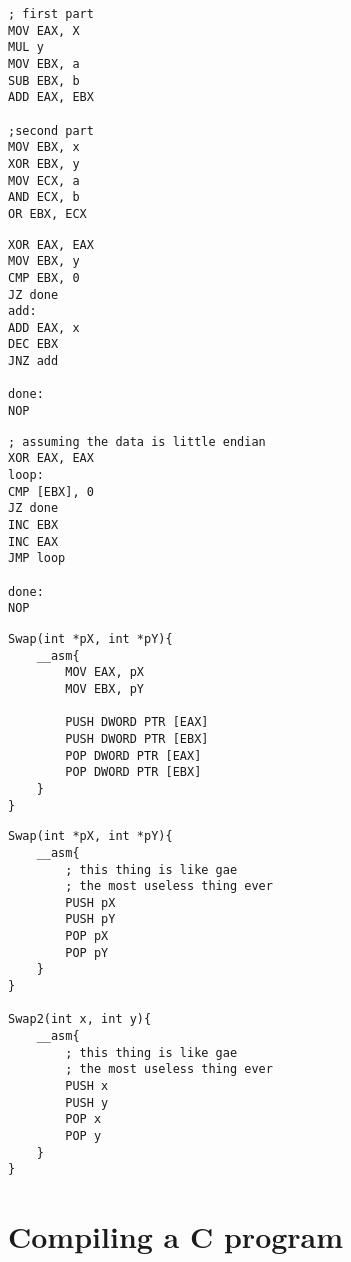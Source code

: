\documentclass[11pt,letterpaper]{article}
\begin{document}

\begin{verbatim}
; first part
MOV EAX, X
MUL y
MOV EBX, a
SUB EBX, b
ADD EAX, EBX

;second part
MOV EBX, x
XOR EBX, y
MOV ECX, a
AND ECX, b
OR EBX, ECX
\end{verbatim}

\pagebreak
{}
\begin{verbatim}
XOR EAX, EAX
MOV EBX, y
CMP EBX, 0
JZ done
add:	
ADD EAX, x
DEC EBX
JNZ add

done:
NOP
\end{verbatim}
\begin{verbatim}
; assuming the data is little endian
XOR EAX, EAX
loop: 
CMP [EBX], 0
JZ done
INC EBX
INC EAX
JMP loop

done:
NOP
\end{verbatim}

\begin{verbatim}
Swap(int *pX, int *pY){
	__asm{
		MOV EAX, pX
		MOV EBX, pY

		PUSH DWORD PTR [EAX]
		PUSH DWORD PTR [EBX]
		POP DWORD PTR [EAX]
		POP DWORD PTR [EBX]
	}
}
\end{verbatim}

\pagebreak

\begin{verbatim}
Swap(int *pX, int *pY){
	__asm{
		; this thing is like gae
		; the most useless thing ever
		PUSH pX
		PUSH pY
		POP pX
		POP pY
	}
}

Swap2(int x, int y){
	__asm{
		; this thing is like gae
		; the most useless thing ever
		PUSH x 
		PUSH y 
		POP x
		POP y
	}
}
\end{verbatim}


\section*{Compiling a C program}
\end{document}
